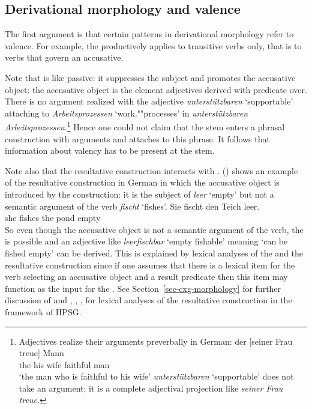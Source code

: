 \documentclass[output=paper]{langsci/langscibook}
\begin{document}
\subsection{Derivational morphology and valence} 

The first argument \citep[Section~5.5.1]{MuellerGT-Eng1} is that certain patterns in derivational morphology refer to valence. For
example, the \bard productively applies to transitive verbs only, that is to verbs that govern an accusative.
\eal
{}
\zl
\begin{sloppypar}
\noindent
Note that \bard is like passive: it suppresses the subject and promotes the accusative object: the
accusative object is the element adjectives derived with \bard predicate over. There is no argument
realized with the adjective \emph{unterstützbaren} `supportable' attaching to \emph{Arbeitsprozessen} `work.""processes' in \emph{unterstützbaren
  Arbeitsprozessen}.\footnote{
Adjectives realize their arguments preverbally in German:
\ea
\gll der [seiner Frau treue] Mann\\
     the \spacebr{}his wife faithful man\\
\glt `the man who is faithful to his wife'
\z
\emph{unterstützbaren} `supportable' does not take an argument; it is a complete adjectival projection like \emph{seiner Frau treue}.
}  Hence one could not claim that the stem enters a phrasal construction with arguments and
 attaches to this phrase. It follows that information about valency has to be present at
the stem. 
\end{sloppypar}

Note also that the resultative construction interacts with \bard. () shows an example of the resultative
construction in German in which the accusative object is introduced by the construction: it is the subject of
\emph{leer} `empty' but not a semantic argument of the verb \emph{fischt} `fishes'.
\ea
\gll Sie fischt den Teich leer.\\
     she fishes the pond empty\\
\z
So even though the accusative object is not a semantic argument of the verb, the \bard is possible
and an adjective like \emph{leerfischbar} `empty fishable' meaning `can be fished empty' can be derived. This is explained by lexical analyses of
the \bard and the resultative construction since if one assumes that there is a lexical item for
the verb  selecting an accusative object and a result predicate then this item may function as
the input for the \bard. See Section~\ref{sec-cxg-morphology} for further discussion of \bard and
 , , ,  for lexical analyses of the resultative construction in the framework of HPSG.
\end{document}
